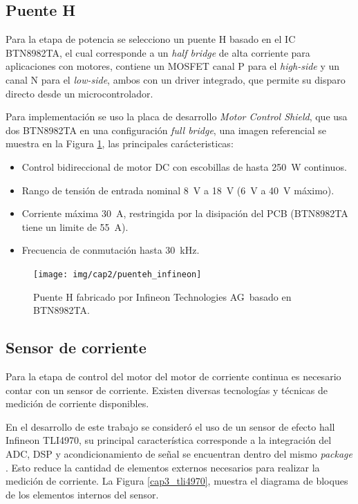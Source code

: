 \subsection{Puente H}

Para la etapa de potencia se selecciono un puente H basado en el IC BTN8982TA, el cual corresponde a un \textit{half bridge} de alta corriente para aplicaciones con motores, contiene 
un MOSFET canal P para el \textit{high-side} y un canal N para el \textit{low-side}, ambos con un driver integrado, que permite su disparo directo desde un microcontrolador.

Para implementación se uso la placa de desarrollo \textit{Motor Control Shield}, que usa dos BTN8982TA en una configuración \textit{full bridge}, una imagen referencial se muestra  en la Figura \ref{cap2_punteh_infineon}, las principales carácteristicas:

\begin{itemize}
\item Control bidireccional de motor DC con escobillas de hasta \SI{250}{\watt} continuos.
\item Rango de tensión de entrada nominal \SI{8}{\volt} a \SI{18}{\volt} (\SI{6}{\volt} a \SI{40}{\volt} máximo).
\item Corriente máxima \SI{30}{\ampere}, restringida por la disipación del PCB (BTN8982TA tiene un limite de \SI{55}{\ampere}).
\item Frecuencia de conmutación hasta \SI{30}{\kilo\hertz}.
\end{itemize}

\begin{figure}[ht]
  \centering
  \texttt{[image: img/cap2/puenteh\_infineon]}
  \caption{Puente H fabricado por Infineon Technologies AG\textregistered \, basado en BTN8982TA.}
  \label{cap2_punteh_infineon}
\end{figure}

\subsection{Sensor de corriente}

Para la etapa de control del motor del motor de corriente continua es necesario contar con un sensor de corriente. Existen diversas tecnologías y técnicas de medición de corriente disponibles.

En el desarrollo de este trabajo se consideró el uso de un sensor de efecto hall Infineon TLI4970, su principal característica corresponde a la integración del ADC, DSP y acondicionamiento de señal se encuentran dentro del mismo \textit{package} \cite{infineonTLI4970}. Esto reduce la cantidad de elementos externos necesarios para realizar la medición de corriente. La Figura \ref{cap3_tli4970}, muestra el diagrama de bloques de los elementos internos del sensor.

